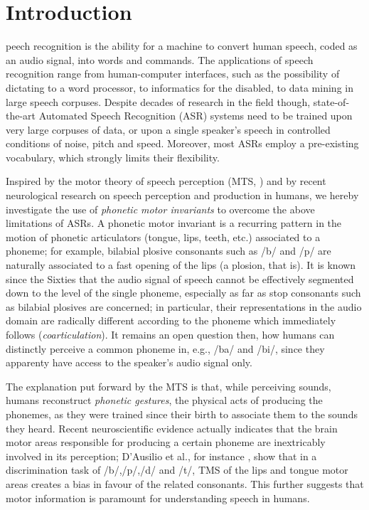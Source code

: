 \section{Introduction}
\label{sec:intro}

peech recognition is the ability for a machine to convert
human speech, coded as an audio signal, into words and commands. The
applications of speech recognition range from human-computer interfaces,
such as the possibility of dictating to a word processor, to informatics
for the disabled, to data mining in large speech corpuses. Despite decades
of research in the field though, state-of-the-art Automated Speech Recognition
(ASR) systems need to be trained upon very large corpuses of data, or upon
a single speaker's speech in controlled conditions of noise, pitch and speed.
Moreover, most ASRs employ a pre-existing vocabulary, which strongly
limits their flexibility.

Inspired by the motor theory of speech perception (MTS, \cite{...}) and by
recent neurological research on speech perception and production in humans, we
hereby investigate the use of \emph{phonetic motor invariants} to overcome
the above limitations of ASRs. A phonetic motor invariant is a recurring
pattern in the motion of phonetic articulators (tongue, lips, teeth, etc.)
associated to a phoneme; for example, bilabial plosive consonants such as
/b/ and /p/ are naturally associated to a fast opening of the lips (a plosion,
that is). It is known since the Sixties \cite{...} that the audio signal of speech
cannot be effectively segmented down to the level of the single phoneme,
especially as far as stop consonants such as bilabial plosives
are concerned; in particular, their representations in the audio domain are
radically different according to the phoneme which immediately follows
(\emph{coarticulation}). It remains an open question then, how humans can
distinctly perceive a common phoneme in, e.g., /ba/ and /bi/, since they
apparenty have access to the speaker's audio signal only.

The explanation put forward by the MTS is that, while perceiving sounds,
humans reconstruct \emph{phonetic gestures}, the physical acts of
producing the phonemes, as they were trained since their birth to associate
them to the sounds they heard. Recent neuroscientific evidence actually
indicates that the brain motor areas responsible
for producing a certain phoneme are inextricably involved in its
perception; D'Ausilio et al., for instance \cite{dausilio}, show that
in a discrimination task of /b/,/p/,/d/ and /t/, TMS of the lips and tongue
motor areas creates a bias in favour of the related consonants. This further
suggests that motor information is paramount for understanding speech in humans.

